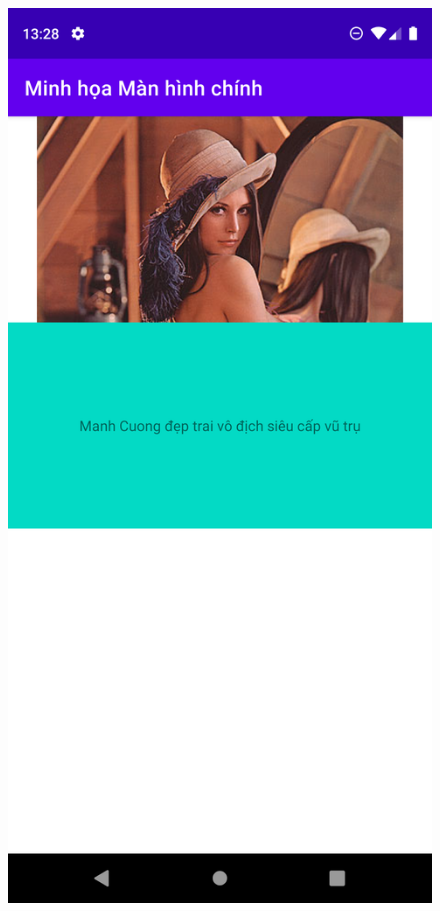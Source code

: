 \documentclass{beamer}
\begin{document}
\begin{frame}
    \begin{columns}
        \begin{figure}
            \centering
            \includegraphics[height=0.7\textheight]{images/10.png}

\end{figure}
\end{columns}
\end{frame}
\end{document}

